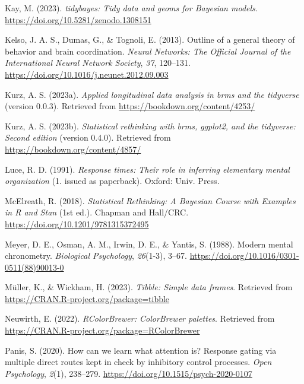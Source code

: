 \documentclass[
  man,floatsintext]{apa6}
\newlength{\cslhangindent}
\newenvironment{CSLReferences}[2] %
 {\begin{list}{}{%
  \setlength{\itemindent}{0pt}
  \setlength{\leftmargin}{0pt}
  \setlength{\parsep}{0pt}
  \ifodd #1
   \setlength{\leftmargin}{\cslhangindent}
   \setlength{\itemindent}{-1\cslhangindent}
  \fi
  \setlength{\itemsep}{#2\baselineskip}}}
 {\end{list}}
\begin{document}
\begin{CSLReferences}{1}{0}
Kay, M. (2023). \emph{{tidybayes}: Tidy data and geoms for {Bayesian} models}. \url{https://doi.org/10.5281/zenodo.1308151}

Kelso, J. A. S., Dumas, G., \& Tognoli, E. (2013). Outline of a general theory of behavior and brain coordination. \emph{Neural Networks: The Official Journal of the International Neural Network Society}, \emph{37}, 120--131. \url{https://doi.org/10.1016/j.neunet.2012.09.003}

Kurz, A. S. (2023a). \emph{Applied longitudinal data analysis in brms and the tidyverse} (version 0.0.3). Retrieved from \url{https://bookdown.org/content/4253/}

Kurz, A. S. (2023b). \emph{Statistical rethinking with brms, ggplot2, and the tidyverse: {Second} edition} (version 0.4.0). Retrieved from \url{https://bookdown.org/content/4857/}

Luce, R. D. (1991). \emph{Response times: Their role in inferring elementary mental organization} (1. issued as paperback). Oxford: Univ. Press.

McElreath, R. (2018). \emph{Statistical {Rethinking}: {A Bayesian Course} with {Examples} in {R} and {Stan}} (1st ed.). {Chapman and Hall/CRC}. \url{https://doi.org/10.1201/9781315372495}

Meyer, D. E., Osman, A. M., Irwin, D. E., \& Yantis, S. (1988). Modern mental chronometry. \emph{Biological Psychology}, \emph{26}(1-3), 3--67. \url{https://doi.org/10.1016/0301-0511(88)90013-0}

Müller, K., \& Wickham, H. (2023). \emph{Tibble: Simple data frames}. Retrieved from \url{https://CRAN.R-project.org/package=tibble}

Neuwirth, E. (2022). \emph{RColorBrewer: ColorBrewer palettes}. Retrieved from \url{https://CRAN.R-project.org/package=RColorBrewer}

Panis, S. (2020). How can we learn what attention is? {Response} gating via multiple direct routes kept in check by inhibitory control processes. \emph{Open Psychology}, \emph{2}(1), 238--279. \url{https://doi.org/10.1515/psych-2020-0107}


\end{CSLReferences}
\end{document}
